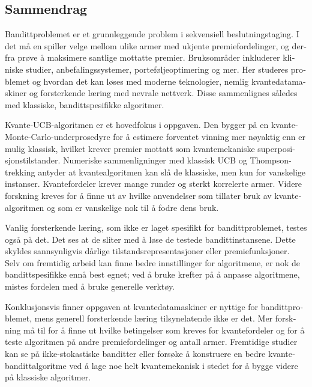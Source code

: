 \begin{otherlanguage}{norsk}

    \chapter{Sammendrag}
    Bandittproblemet er et grunnleggende problem i sekvensiell beslutningstaging.
    I det må en spiller velge mellom ulike armer med ukjente premiefordelinger, og derfra prøve å maksimere santlige mottatte premier.
    Bruksområder inkluderer kliniske studier, anbefalingssystemer, porteføljeoptimering og mer.
    Her studeres problemet og hvordan det kan løses med moderne teknologier, nemlig kvantedatamaskiner og forsterkende læring med nevrale nettverk.
    Disse sammenlignes således med klassiske, bandittspesifikke algoritmer.

    Kvante-UCB-algoritmen er et hovedfokus i oppgaven.
    Den bygger på en kvante-Monte-Carlo-underprosedyre for å estimere forventet vinning mer nøyaktig enn er mulig klassisk, hvilket krever premier mottatt som kvantemekaniske superposisjonstilstander.
    Numeriske sammenligninger med klassisk UCB og Thompson-trekking antyder at kvantealgoritmen kan slå de klassiske, men kun for vanskelige instanser.
    Kvantefordeler krever mange runder og sterkt korrelerte armer.
    Videre forskning kreves for å finne ut av hvilke anvendelser som tillater bruk av kvantealgoritmen og som er vanskelige nok til å fodre dens bruk.

    Vanlig forsterkende læring, som ikke er laget spesifikt for bandittproblemet, testes også på det.
    Det ses at de sliter med å løse de testede bandittinstansene.
    Dette skyldes sannsynligvis dårlige tilstandsrepresentasjoner eller premiefunksjoner.
    Selv om fremtidig arbeid kan finne bedre innstillinger for algoritmene, er nok de bandittspesifikke ennå best egnet; ved å bruke krefter på å anpasse algoritmene, mistes fordelen med å bruke generelle verktøy.

    Konklusjonsvis finner oppgaven at kvantedatamaskiner er nyttige for bandittproblemet, mens generell forsterkende læring tilsynelatende ikke er det.
    Mer forskning må til for å finne ut hvilke betingelser som kreves for kvantefordeler og for å teste algoritmen på andre premiefordelinger og antall armer.
    Fremtidige studier kan se på ikke-stokastiske banditter eller forsøke å konstruere en bedre kvantebandittalgoritme ved å lage noe helt kvantemekanisk i stedet for å bygge videre på klassiske algoritmer.

\end{otherlanguage}

\cleardoublepage